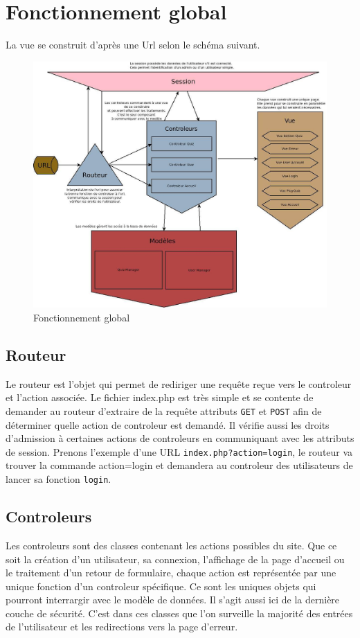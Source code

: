 \documentclass[11pt,titlepage]{article}
\begin{document}
\section{Fonctionnement global}

La vue se construit d'après une Url selon le schéma suivant.

\begin{figure}[!ht]
\centering
\includegraphics[width=12cm]{schemaFonctionnement.jpg}
\caption{Fonctionnement global}
\end{figure}

\newpage

\subsection{Routeur}
Le routeur est l'objet qui permet de rediriger une requête reçue vers le controleur et l'action associée.
Le fichier index.php est très simple et se contente de demander au routeur d'extraire de la requête attributs \texttt{GET} et \texttt{POST} afin de déterminer quelle action de controleur est demandé.
Il vérifie aussi les droits d'admission à certaines actions de controleurs en communiquant avec les attributs de session. 
Prenons l'exemple d'une URL \texttt{index.php?action=login}, 
le routeur va trouver la commande action=login et demandera au controleur des utilisateurs de lancer sa fonction \texttt{login}.

\subsection{Controleurs}
Les controleurs sont des classes contenant les actions possibles du site. 
Que ce soit la création d'un utilisateur, sa connexion, l'affichage de la page d'accueil ou le traitement d'un retour de formulaire,
chaque action est représentée par une unique fonction d'un controleur spécifique.
Ce sont les uniques objets qui pourront interrargir avec le modèle de données.
Il s'agit aussi ici de la dernière couche de sécurité. 
C'est dans ces classes que l'on surveille la majorité des entrées de l'utilisateur et les redirections vers la page d'erreur.
\end{document}
